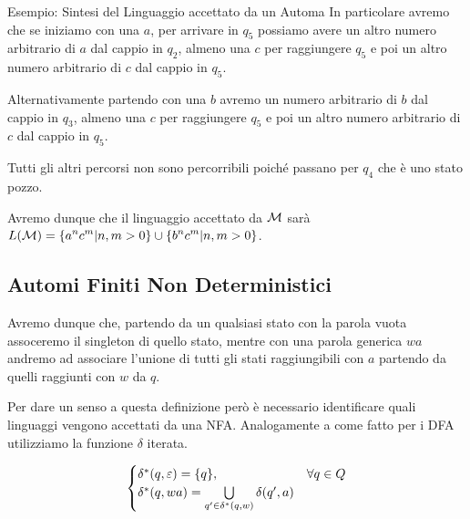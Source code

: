 \begin{generalbox}[colframe=azure-gradient-3!90!black]{Esempio: Sintesi del Linguaggio accettato da un Automa}
  In particolare avremo che se iniziamo con una \(a\), per arrivare in \(q_5\) possiamo avere un altro numero arbitrario di \(a\) dal cappio in \(q_2\), almeno una \(c\) per raggiungere \(q_5\) e poi un altro numero arbitrario di \(c\) dal cappio in \(q_5\).

  Alternativamente partendo con una \(b\) avremo un numero arbitrario di \(b\) dal cappio in \(q_3\), almeno una \(c\) per raggiungere \(q_5\) e poi un altro numero arbitrario di \(c\) dal cappio in \(q_5\).

  Tutti gli altri percorsi non sono percorribili poiché passano per \(q_4\) che è uno stato pozzo.

  Avremo dunque che il linguaggio accettato da \(\mathcal{M}\) sarà \(L(\mathcal{M})=\displaystyle{\left\{{a^{n}c^m\vert n,m >0}\right\}} \cup \displaystyle{\left\{{b^{n}c^m\vert n,m >0}\right\}} \).
\end{generalbox}

\subsection{Automi Finiti Non Deterministici}


Avremo dunque che, partendo da un qualsiasi stato con la parola vuota assoceremo il singleton di quello stato, mentre con una parola generica \(wa\) andremo ad associare l'unione di tutti gli stati raggiungibili con \(a\) partendo da quelli raggiunti con \(w\) da \(q\).

Per dare un senso a questa definizione però è necessario identificare quali linguaggi vengono accettati da una NFA. Analogamente a come fatto per i DFA utilizziamo la funzione \(\delta\) iterata. %

\begin{equation}
  \begin{cases}
    \delta^*(q,\varepsilon)=\displaystyle{\left\{{q}\right\}}, & \forall q \in Q\\
    \delta^*(q,wa)=\bigcup\limits_{q' \in \delta^*(q,w)} \delta(q', a)
  \end{cases}
\end{equation}

